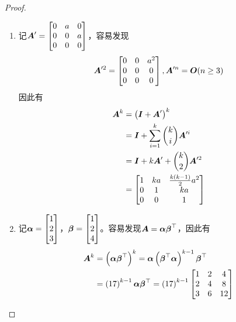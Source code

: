\begin{proof}
    \begin{enumerate}
        \item 记\(\boldsymbol{A}'=\begin{bmatrix}0&a&0\\0&0&a\\0&0&0\end{bmatrix}\)，容易发现
              \begin{equation*}
                  \boldsymbol{A}'^2=\begin{bmatrix}0&0&a^2\\0&0&0\\0&0&0\end{bmatrix},\boldsymbol{A}'^n=\boldsymbol{O}(n\ge3)
              \end{equation*}
              因此有
              \begin{align*}
                  \boldsymbol{A}^k & =\left( \boldsymbol{I}+\boldsymbol{A}' \right)^k                 \\
                          & =\boldsymbol{I}+\sum_{i=1}^k\binom{k}{i}\boldsymbol{A}'^i \\
                          & =\boldsymbol{I}+k\boldsymbol{A}'+\binom{k}{2}\boldsymbol{A}'^2     \\
                          & =\begin{bmatrix}
                                 1 & ka & \frac{k(k-1)}{2}a^2 \\
                                 0 & 1  & ka                  \\
                                 0 & 0  & 1
                             \end{bmatrix}
              \end{align*}
        \item 记\(\boldsymbol{\alpha}=\begin{bmatrix}1\\2\\3\end{bmatrix}\)，\(\boldsymbol{\beta}=\begin{bmatrix}1\\2\\4\end{bmatrix}\)。容易发现\(\boldsymbol{A}=\boldsymbol{\alpha}\boldsymbol{\beta}^\top\)，因此有
              \begin{align*}
                  \boldsymbol{A}^k & =\left( \boldsymbol{\alpha}\boldsymbol{\beta}^\top \right)^k=\boldsymbol{\alpha}\left( \boldsymbol{\beta}^\top\boldsymbol{\alpha} \right)^{k-1}\boldsymbol{\beta}^\top \\
                          & =\left( 17 \right)^{k-1}\boldsymbol{\alpha}\boldsymbol{\beta}^\top=\left( 17 \right)^{k-1}
                  \begin{bmatrix}
                      1 & 2 & 4 \\2&4&8\\3&6&12
                  \end{bmatrix}
              \end{align*}
    \end{enumerate}
\end{proof}

